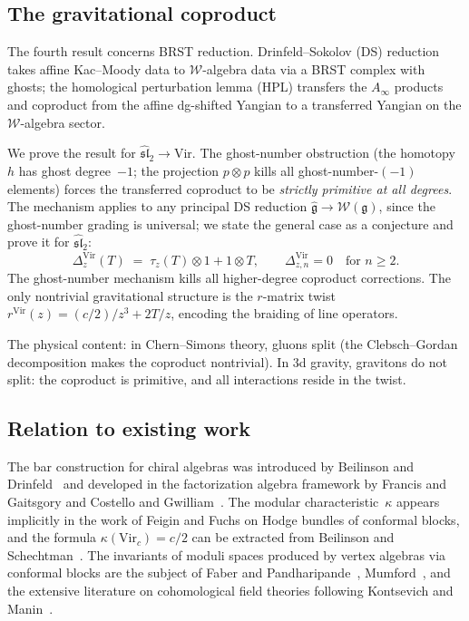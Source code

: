 \documentclass[11pt,reqno]{amsart}
\theoremstyle{definition}
\theoremstyle{remark}
\newcommand{\fg}{\mathfrak{g}}
\newcommand{\Vir}{\mathrm{Vir}}
\newcommand{\cW}{\mathcal{W}}
\numberwithin{equation}{section}
\begin{document}
\subsection{The gravitational coproduct}

The fourth result concerns BRST reduction. Drinfeld--Sokolov (DS)
reduction takes affine Kac--Moody data to $\cW$-algebra data via a
BRST complex with ghosts; the homological perturbation lemma
(HPL) transfers the $A_\infty$ products and coproduct from
the affine dg-shifted Yangian to a transferred Yangian on the
$\cW$-algebra sector.

We prove the result for $\widehat{\mathfrak{sl}}_2 \to \Vir$.
The ghost-number obstruction (the homotopy~$h$ has
ghost degree~$-1$; the projection $p \otimes p$ kills all
ghost-number-$(-1)$ elements) forces the transferred coproduct to
be \emph{strictly primitive at all degrees}. The mechanism
applies to any principal DS reduction
$\widehat{\fg} \to \cW(\fg)$, since the ghost-number grading
is universal; we state the general case
as a conjecture and prove it
for $\widehat{\mathfrak{sl}}_2$:
\[
 \Delta_z^{\Vir}(T)
 \;=\;
 \tau_z(T) \otimes 1 + 1 \otimes T,
 \qquad
 \Delta_{z,n}^{\Vir} = 0
 \quad\text{for } n \ge 2.
\]
The ghost-number mechanism kills all higher-degree coproduct
corrections. The only nontrivial gravitational structure is
the $r$-matrix twist $r^{\Vir}(z) = (c/2)/z^3 + 2T/z$,
encoding the braiding of line operators.

The physical content: in Chern--Simons theory, gluons split
(the Clebsch--Gordan decomposition makes the coproduct nontrivial).
In $3$d gravity, gravitons do not split: the coproduct is
primitive, and all interactions reside in the twist.

\subsection{Relation to existing work}

The bar construction for chiral algebras was introduced by
Beilinson and Drinfeld~\cite{BD04} and developed in the
factorization algebra framework by Francis and Gaitsgory
\cite{FG12} and Costello and Gwilliam~\cite{CG17}.
The modular characteristic~$\kappa$ appears implicitly in the
work of Feigin and Fuchs on Hodge bundles of conformal blocks,
and the formula $\kappa(\Vir_c) = c/2$ can be extracted from
Beilinson and Schechtman~\cite{BS88}.
The invariants of moduli spaces produced by vertex algebras via
conformal blocks are the subject of Faber and
Pandharipande~\cite{FP00}, Mumford~\cite{Mumford83}, and the
extensive literature on cohomological field theories following
Kontsevich and Manin~\cite{KM94}.
\end{document}
